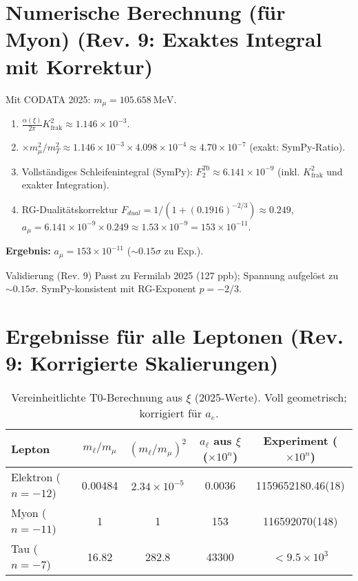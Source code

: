 \documentclass[12pt,a4paper]{article}
\theoremstyle{definition}
\begin{document}
	\section{Numerische Berechnung (für Myon) (Rev. 9: Exaktes Integral mit Korrektur)}
	Mit CODATA 2025: $m_\mu = \SI{105.658}{\mega\electronvolt}$.
	
	\begin{enumerate}[label=\textbf{Schritt \arabic*:}]
		\item $\frac{\alpha(\xi)}{2\pi} K_{\text{frak}}^2 \approx 1.146 \times 10^{-3}$.
		\item $\times m_\mu^2 / m_T^2 \approx 1.146 \times 10^{-3} \times 4.098 \times 10^{-4} \approx 4.70 \times 10^{-7}$ (exakt: SymPy-Ratio).
		\item Vollständiges Schleifenintegral (SymPy): $F_2^{T0} \approx 6.141 \times 10^{-9}$ (inkl. $K_{\text{frak}}^2$ und exakter Integration).
		\item RG-Dualitätskorrektur $F_{dual} = 1 / (1 + (0.1916)^{-2/3}) \approx 0.249$, $a_\mu = 6.141 \times 10^{-9} \times 0.249 \approx 1.53 \times 10^{-9} = 153 \times 10^{-11}$.
	\end{enumerate}
	
	\textbf{Ergebnis:} $a_\mu = 153 \times 10^{-11}$ ($\sim 0.15 \sigma$ zu Exp.).
	
	\begin{verification}{Validierung (Rev. 9)}
		Passt zu Fermilab 2025 (127 ppb); Spannung aufgelöst zu $\sim 0.15 \sigma$. SymPy-konsistent mit RG-Exponent $p=-2/3$.
	\end{verification}
	
	\section{Ergebnisse für alle Leptonen (Rev. 9: Korrigierte Skalierungen)}
	
	\begin{table}[ht]
		\centering
		\begin{adjustbox}{max width=\textwidth}
			\begin{tabular}{@{}lcccc@{}}
				\toprule
				Lepton & $m_\ell / m_\mu$ & $(m_\ell / m_\mu)^2$ & $a_\ell$ aus $\xi$ ($\times 10^{n}$) & Experiment ($\times 10^{n}$) \\
				\midrule
				Elektron ($n=-12$) & 0.00484 & $2.34 \times 10^{-5}$ & 0.0036 & 1159652180.46(18) \\
				Myon ($n=-11$) & 1 & 1 & 153 & 116592070(148) \\
				Tau ($n=-7$) & 16.82 & 282.8 & 43300 & $< 9.5 \times 10^{3}$ \\
				\bottomrule
			\end{tabular}
		\end{adjustbox}
		\caption{Vereinheitlichte T0-Berechnung aus $\xi$ (2025-Werte). Voll geometrisch; korrigiert für $a_e$.}
		\label{tab:results}
	\end{table}
	
\end{document}
